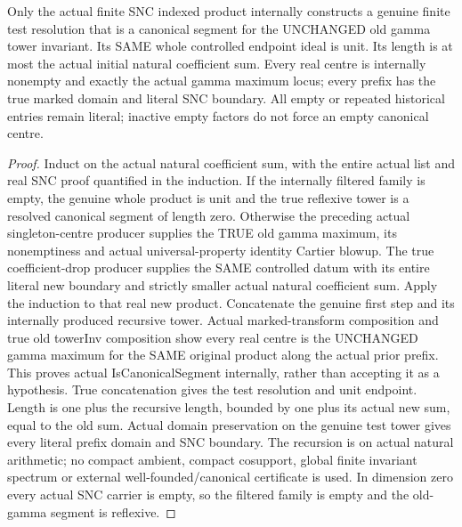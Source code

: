 \begin{theorem}
\label{hir:nc-ordered-tail-actual-canonical-resolution}
\leanok
Only the actual finite SNC indexed product internally constructs a genuine
finite test resolution that is a canonical segment for the UNCHANGED old
gamma tower invariant. Its SAME whole controlled endpoint ideal is unit.
Its length is at most the actual initial natural coefficient sum. Every real
centre is internally nonempty and exactly the actual gamma maximum locus;
every prefix has the true marked domain and literal SNC boundary. All empty
or repeated historical entries remain literal; inactive empty factors do not
force an empty canonical centre.
\end{theorem}
\begin{proof}
Induct on the actual natural coefficient sum, with the entire actual list
and real SNC proof quantified in the induction. If the internally filtered
family is empty, the genuine whole product is unit and the true reflexive
tower is a resolved canonical segment of length zero. Otherwise the preceding
actual singleton-centre producer supplies the TRUE old gamma maximum, its
nonemptiness and actual universal-property identity Cartier blowup. The true
coefficient-drop producer supplies the SAME controlled datum with its entire
literal new boundary and strictly smaller actual natural coefficient sum.
Apply the induction to that real new product. Concatenate the genuine first
step and its internally produced recursive tower. Actual marked-transform
composition and true old towerInv composition show every real centre is the
UNCHANGED gamma maximum for the SAME original product along the actual prior
prefix. This proves actual IsCanonicalSegment internally, rather than
accepting it as a hypothesis. True concatenation gives the test resolution
and unit endpoint. Length is one plus the recursive length, bounded by one
plus its actual new sum, equal to the old sum. Actual domain preservation on
the genuine test tower gives every literal prefix domain and SNC boundary.
The recursion is on actual natural arithmetic; no compact ambient, compact
cosupport, global finite invariant spectrum or external well-founded/canonical
certificate is used. In dimension zero every actual SNC carrier is empty,
so the filtered family is empty and the old-gamma segment is reflexive.
\end{proof}

